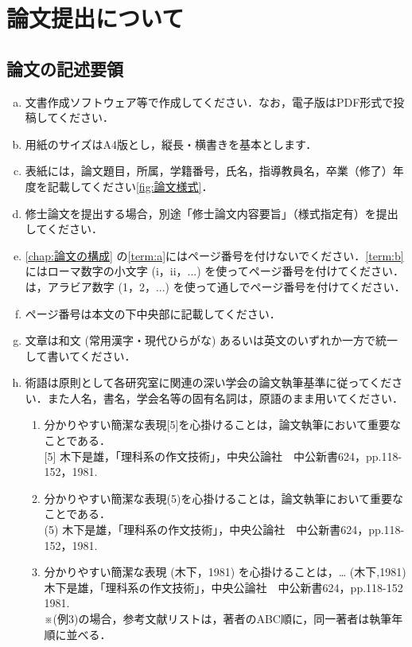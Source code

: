 \chapter{論文提出について}
    \section{論文の記述要領}
        \begin{enumerate}[a.]
            \item 文書作成ソフトウェア等で作成してください．なお，電子版はPDF形式で投稿してください．
            \item 用紙のサイズはA4版とし，縦長・横書きを基本とします．
            \item 表紙には，論文題目，所属，学籍番号，氏名，指導教員名，卒業（修了）年度を記載してください\cref{fig:論文様式}．
            \item 修士論文を提出する場合，別途「修士論文内容要旨」（様式指定有）を提出してください．
            \item \cref{chap:論文の構成} の\cref{term:a}にはページ番号を付けないでください．\cref{term:b}にはローマ数字の小文字 (i，ii，...) を使ってページ番号を付けてください．は，アラビア数字 (1，2，...) を使って通しでページ番号を付けてください．
            \item ページ番号は本文の下中央部に記載してください．
            \item 文章は和文 (常用漢字・現代ひらがな) あるいは英文のいずれか一方で統一して書いてください．
            \item 術語は原則として各研究室に関連の深い学会の論文執筆基準に従ってください．また人名，書名，学会名等の固有名詞は，原語のまま用いてください．

                \begin{enumerate}[(例1)]
                    \item
                            分かりやすい簡潔な表現[5]を心掛けることは，論文執筆において重要なことである．\\
                            {[5]} 木下是雄，「理科系の作文技術」，中央公論社　中公新書624，pp.118-152，1981.
                    \item
                            分かりやすい簡潔な表現(5)を心掛けることは，論文執筆において重要なことである．\\
                            (5) 木下是雄，「理科系の作文技術」，中央公論社　中公新書624，pp.118-152，1981.
                    \item \label{例3}
                            分かりやすい簡潔な表現 (木下，1981) を心掛けることは，…
                            (木下,1981)  \\
                            木下是雄，「理科系の作文技術」，中央公論社　中公新書624，pp.118-152 1981.\\
                            ※(例3)の場合，参考文献リストは，著者のABC順に，同一著者は執筆年順に並べる．
                \end{enumerate}


\end{enumerate}
